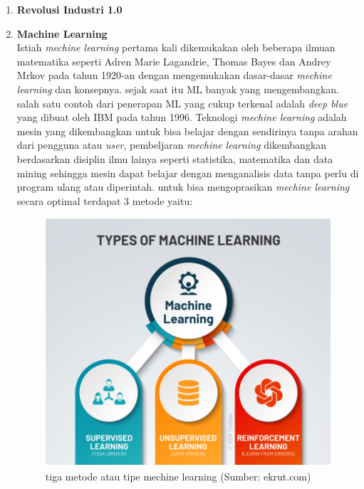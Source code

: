 \begin{enumerate}
  \item \textbf{Revolusi Industri 1.0} \\
     
  \item \textbf{Machine Learning}  \\
    Istiah \textit{mechine learning}  pertama kali dikemukakan oleh beberapa ilmuan matematika seperti Adren Marie Lagandrie, Thomas Bayes dan Andrey Mrkov pada tahun 1920-an dengan mengemukakan dasar-dasar \textit{mechine learning} dan konsepnya. sejak saat itu ML banyak yang mengembangkan. salah satu contoh dari penerapan ML yang cukup terkenal adalah \textit{deep blue} yang dibuat oleh IBM pada tahun 1996.
    Teknologi \textit{mechine learning}  adalah mesin yang dikembangkan untuk bisa belajar dengan sendirinya tanpa arahan dari pengguna atau \textit{user}, pembeljaran \textit{mechine learning}  dikembangkan berdasarkan disiplin ilmu lainya seperti statistika, matematika dan data mining sehingga mesin dapat belajar dengan menganalisis data tanpa perlu di program ulang atau diperintah.
    untuk bisa mengoprasikan \textit{mechine learning} secara optimal terdapat 3 metode yaitu: 
    \begin{figure} [ht] \centering
      \includegraphics[scale=0.9]{gambar/metode_ML.png}
      \caption{tiga metode atau tipe mechine learning (Sumber: ekrut.com)}

\end{figure}
\end{enumerate}
